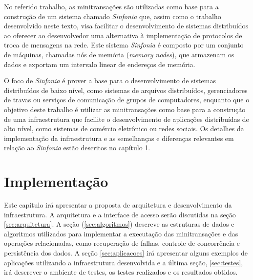 \documentclass[11pt,twoside,a4paper]{book}
\begin{document}
No referido trabalho, as minitransações são utilizadas como base para a construção de um sistema chamado \emph{Sinfonia} que, assim como o trabalho desenvolvido neste texto, visa facilitar o desenvolvimento de sistemas distribuídos ao oferecer ao desenvolvedor uma alternativa à implementação de protocolos de troca de mensagens na rede. Este sistema \emph{Sinfonia} é composto por um conjunto de máquinas, chamadas nós de memória (\emph{memory nodes}), que armazenam os dados e exportam um intervalo linear de endereços de memória. 

O foco de \emph{Sinfonia} é prover a base para o desenvolvimento de sistemas distribuídos de baixo nível, como sistemas de arquivos distribuídos, gerenciadores de travas ou serviços de comunicação de grupos de computadores, enquanto que o objetivo deste trabalho é utilizar as minitransações como base para a construção de uma infraestrutura que facilite o desenvolvimento de aplicações distribuídas de alto nível, como sistemas de comércio eletrônico ou redes sociais. Os detalhes da implementação da infraestrutura e as semelhanças e diferenças relevantes em relação ao \emph{Sinfonia} estão descritos no capítulo \ref{chap:implementacao}.

\chapter{Implementação}
\label{chap:implementacao}


Este capítulo irá apresentar a proposta de arquitetura e desenvolvimento da infraestrutura. A arquitetura e a interface de acesso serão discutidas na seção \ref{sec:arquitetura}. A seção (\ref{sec:algoritmos}) descreve as estruturas de dados e algoritmos utilizados para implementar a executação das minitransações e das operações relacionadas, como recuperação de falhas, controle de concorrência e persistência dos dados. A seção \ref{sec:aplicacoes} irá apresentar alguns exemplos de aplicações utilizando a infraestrutura desenvolvida e a última seção, \ref{sec:testes}, irá descrever o ambiente de testes, os testes realizados e os resultados obtidos.
\end{document}
